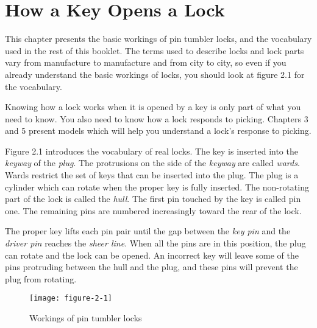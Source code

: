 \chapter{How a Key Opens a Lock}
This chapter presents the basic workings of pin tumbler locks, and the vocabulary used in the rest of this booklet.
The terms used to describe locks and lock parts vary from manufacture to manufacture and from city to city, so even if you already understand the basic workings of locks, you should look at figure 2.1 for the vocabulary.

Knowing how a lock works when it is opened by a key is only part of what you need to know.
You also need to know how a lock responds to picking. Chapters 3 and 5 present models which will help you understand a lock's response to picking.

Figure 2.1 introduces the vocabulary of real locks.
The key is inserted into the \textit{keyway} of the \textit{plug}.
The protrusions on the side of the \textit{keyway} are called \textit{wards}.
Wards restrict the set of keys that can be inserted into the plug.
The plug is a cylinder which can rotate when the proper key is fully inserted.
The non-rotating part of the lock is called the \textit{hull}.
The first pin touched by the key is called pin one.
The remaining pins are numbered increasingly toward the rear of the lock.

The proper key lifts each pin pair until the gap between the \textit{key pin} and the \textit{driver pin} reaches the \textit{sheer line}.
When all the pins are in this position, the plug can rotate and the lock can be opened.
An incorrect key will leave some of the pins protruding between the hull and the plug, and these pins will prevent the plug from rotating.

\begin{figure}[b]
    \texttt{[image: figure-2-1]}
    \caption{Workings of pin tumbler locks}
\end{figure}
